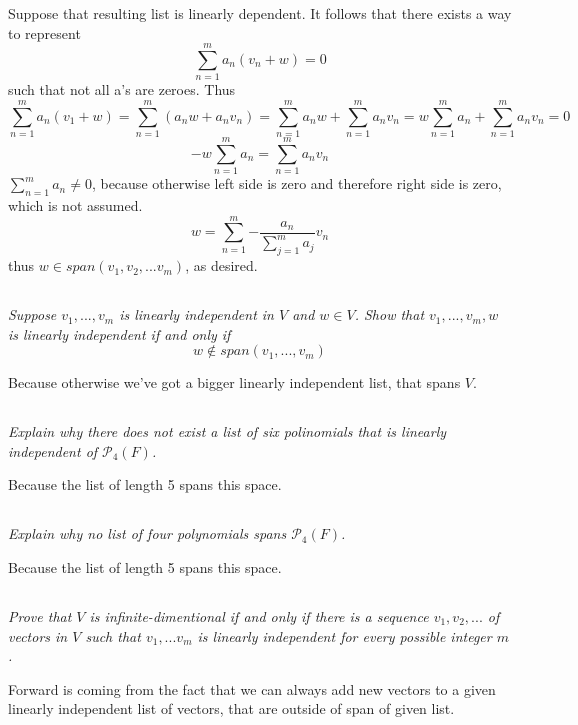 \documentclass[11pt,oneside,titlepage]{book}
\begin{document}
Suppose that resulting list is linearly dependent. It follows that there
exists a way to represent 
$$\sum_{n = 1}^m{a_n (v_n + w)} = 0$$
such that not all a's are zeroes. Thus
$$\sum_{n = 1}^m{a_n (v_1 + w)} = \sum_{n = 1}^m{(a_n w + a_n v_n)} =
\sum_{n = 1}^m{a_n w} + \sum_{n = 1}^m{a_n v_n} =
w \sum_{n = 1}^m{a_n} + \sum_{n = 1}^m{a_n v_n} = 0
$$
$$- w \sum_{n = 1}^m{a_n} =  \sum_{n = 1}^m{a_n v_n}$$
$\sum_{n = 1}^m{a_n} \neq 0$, because otherwise left side is zero and
therefore right side is zero, which is not assumed.
$$w  =  \sum_{n = 1}^m{ - \frac{a_n}{\sum_{j = 1}^m{a_j}} v_n}$$
thus $w \in span(v_1, v_2, ... v_m)$, as desired.


\subsection{}
\textit{Suppose $v_1, ..., v_m$ is linearly independent in $V$ and $w \in V$.
  Show that $v_1, ..., v_m, w$ is linearly independent if and only if }
$$w \notin span(v_1, ..., v_m)$$

Because otherwise we've got a bigger linearly independent list, that spans
$V$.

\subsection{}
\textit{Explain why there does not exist a list of six polinomials that is
  linearly independent of $\mathcal{P_4}(F)$.}

Because the list of length 5 spans this space.

\subsection{}
\textit{Explain why no list of four polynomials spans $\mathcal{P_4}(F)$.}

Because the list of length 5 spans this space.

\subsection{}
\textit{Prove that $V$ is infinite-dimentional if and only if there is a
  sequence $v_1, v_2, ... $ of vectors in $V$ such that $v_1, ... v_m$ is
  linearly independent for every possible integer $m$.}

Forward is coming from the fact that we can always add new vectors
to a given linearly independent list of vectors, that are outside of span
of given list.
\end{document}
